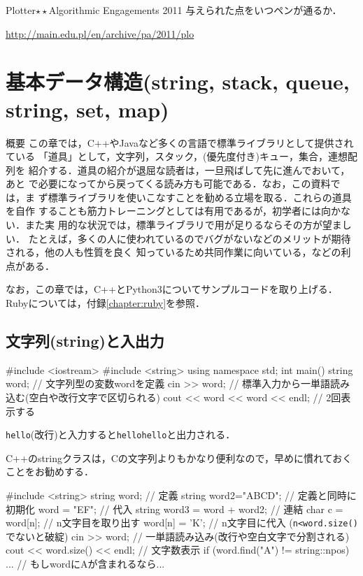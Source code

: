 \begin{pbox}{Plotter$\star\star$}{Algorithmic Engagements 2011}
与えられた点をいつペンが通るか．
  
\url{http://main.edu.pl/en/archive/pa/2011/plo}
\end{pbox}
 \chapter{基本データ構造(string, stack, queue, string, set, map)}\label{chapter:datastructure}

\begin{itembox}[l]{概要}
この章では，C++やJavaなど多くの言語で標準ライブラリとして提供されている
「道具」として，文字列，スタック，(優先度付き)キュー，集合，連想配列を
紹介する．道具の紹介が退屈な読者は，一旦飛ばして先に進んでおいて，あと
で必要になってから戻ってくる読み方も可能である．なお，この資料では，ま
ず標準ライブラリを使いこなすことを勧める立場を取る．これらの道具を自作
することも筋力トレーニングとしては有用であるが，初学者には向かない．また実
用的な状況では，標準ライブラリで用が足りるならその方が望ましい．
たとえば，多くの人に使われているのでバグがないなどのメリットが期待される，他の人も性質を良く
知っているため共同作業に向いている，などの利点がある．

なお，この章では，C++とPython3についてサンプルコードを取り上げる．Rubyについては，付録\ref{chapter:ruby}を参照．
\end{itembox}

\section{文字列(string)と入出力}

\begin{cbox}[emph={string}]
#include <iostream>
#include <string>
using namespace std;
int main() {
  string word; // 文字列型の変数wordを定義
  cin >> word; // 標準入力から一単語読み込む(空白や改行文字で区切られる)
  cout << word << word << endl; // 2回表示する
}  
\end{cbox}

\texttt{hello}(改行)と入力すると\texttt{hellohello}と出力される．

C++のstringクラスは，Cの文字列よりもかなり便利なので，早めに慣れておく
ことをお勧めする．

\begin{cbox}
#include <string>
  string word; // 定義
  string word2="ABCD"; // 定義と同時に初期化
  word = "EF"; // 代入
  string word3 = word + word2; // 連結
  char c = word[n]; // n文字目を取り出す
  word[n] = 'K'; // n文字目に代入 (\texttt{n<word.size()}でないと破綻)
  cin >> word; // 一単語読み込み(改行や空白文字で分割される)
  cout << word.size() << endl; // 文字数表示
  if (word.find("A") != string::npos) ... // もしwordにAが含まれるなら...
\end{cbox}

